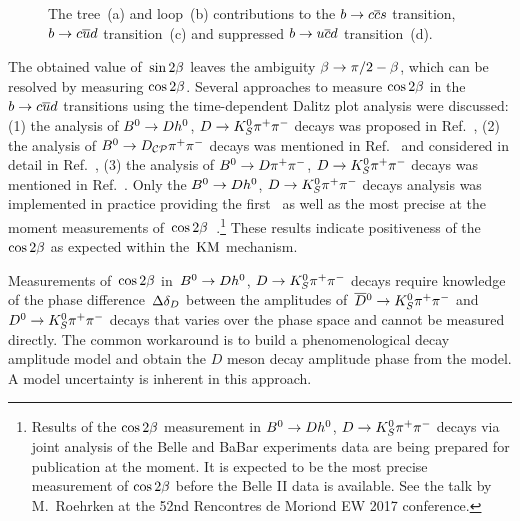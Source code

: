 \documentclass[a4paper,11pt]{article}
\begin{document}
\begin{figure}
 \centering
  \hspace{0.03\textwidth}
   \hspace{0.03\textwidth}
  \hspace{0.03\textwidth}
 \caption{The tree~(a) and loop~(b) contributions to the $b\to c\overline{c}s$ transition, 
 $b\to c\overline{u}d$ transition~(c) and suppressed $b\to u\overline{c}d$ transition~(d).}
 \label{fig:btransitions}
\end{figure}

The obtained value of~$\sin{2\beta}$ leaves the ambiguity $\beta\to\pi/2 - \beta$, 
which can be resolved by measuring $\cos{2\beta}$.  Several approaches to 
measure $\cos{2\beta}$ in the $b\to c\overline{u}d$ transitions using the time-dependent Dalitz 
plot analysis were discussed: (1) the analysis of $B^0\to D h^0$, $D\to K_S^0\pi^+\pi^-$ decays was proposed 
in Ref.~\cite{gershon_bondar_krokovny}, (2) the analysis of $B^0\to D_{\mathcal{CP}}\pi^+\pi^-$ 
decays was mentioned in Ref.~\cite{cyopr} and considered in detail in 
Ref.~\cite{latham_gershon}, (3) the analysis of $B^0\to D\pi^+\pi^-$, $D\to K_S^0\pi^+\pi^-$ decays was mentioned 
in Ref.~\cite{latham_gershon}. Only the $B^0\to D h^0$, $D\to K_S^0\pi^+\pi^-$ decays analysis was 
implemented in practice providing the first~\cite{cosbeta_first_result} 
as well as the most precise at the moment measurements of~$\cos{2\beta}$~\cite{cosbeta_babar, cosbeta_belle}.\footnote{Results of the $\cos{2\beta}$ measurement in $B^0\to D h^0$, $D\to K_S^0\pi^+\pi^-$ decays via joint analysis of the Belle and BaBar experiments data are being prepared for publication at the moment. It is expected to be the most precise measurement of $\cos{2\beta}$ before the Belle II data is available. See the talk by M.~Roehrken at the 52nd Rencontres de Moriond EW 2017 conference.}
These results indicate positiveness of the~$\cos{2\beta}$ as expected within 
the~$\mathrm{KM}$ mechanism.

Measurements of~$\cos{2\beta}$ in~$B^0\to D h^0$, $D\to K_S^0\pi^+\pi^-$ decays 
require knowledge of the phase difference~$\Delta\delta_D$ between the amplitudes 
of~$\overline{D}{}^0\to K_S^0\pi^+\pi^-$ and~$D^0 \to K_S^0\pi^+\pi^-$ decays that varies over the phase space and cannot 
be measured directly.  The common workaround is to build a phenomenological 
decay amplitude model and obtain the $D$ meson decay amplitude phase from the 
model.  A model uncertainty is inherent in this approach.
\end{document}

